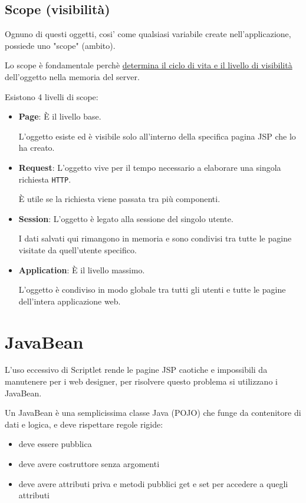\subsection{Scope (visibilità)}
Ognuno di questi oggetti, cosi' come qualsiasi variabile create nell'applicazione, possiede uno "scope" (ambito).

Lo scope è fondamentale perchè \uline{determina il ciclo di vita e il livello di visibilità} dell'oggetto nella memoria del server.

Esistono 4 livelli di scope:
\begin{itemize}
    \item \textbf{Page}: È il livello base.

    L'oggetto esiste ed è visibile solo all'interno della specifica pagina JSP che lo ha creato.
    \item \textbf{Request}: L'oggetto vive per il tempo necessario a elaborare una singola richiesta \texttt{HTTP}.

    È utile se la richiesta viene passata tra più componenti.
    \item \textbf{Session}: L'oggetto è legato alla sessione del singolo utente.

    I dati salvati qui rimangono in memoria e sono condivisi tra tutte le pagine visitate da quell'utente specifico.
    \item \textbf{Application}: È il livello massimo.

    L'oggetto è condiviso in modo globale tra tutti gli utenti e tutte le pagine dell'intera applicazione web.
\end{itemize}

\section{JavaBean}
L'uso eccessivo di Scriptlet rende le pagine JSP caotiche e impossibili da manutenere per i web designer, per risolvere questo problema si utilizzano i JavaBean.

Un JavaBean è una semplicissima classe Java (POJO) che funge da contenitore di dati e logica, e deve rispettare regole rigide: 
\begin{itemize}
    \item deve essere pubblica
    \item deve avere costruttore senza argomenti
    \item deve avere attributi priva e metodi pubblici get e set per accedere a quegli attributi
\end{itemize}

